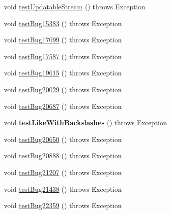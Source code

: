 \begin{DoxyCompactItemize}
void \mbox{\hyperlink{classtestsuite_1_1regression_1_1_statement_regression_test_a7695fd8186a02b78d65dc3af0db02e34}{test\+Updatable\+Stream}} ()  throws Exception 
\item 
void \mbox{\hyperlink{classtestsuite_1_1regression_1_1_statement_regression_test_a8077d99b51217d8479e3637eac582d17}{test\+Bug15383}} ()  throws Exception 
\item 
void \mbox{\hyperlink{classtestsuite_1_1regression_1_1_statement_regression_test_af66916471e845ecaf25d5a2e0e3b67eb}{test\+Bug17099}} ()  throws Exception 
\item 
void \mbox{\hyperlink{classtestsuite_1_1regression_1_1_statement_regression_test_a31f8a70535a902a36164d60c222d0430}{test\+Bug17587}} ()  throws Exception 
\item 
void \mbox{\hyperlink{classtestsuite_1_1regression_1_1_statement_regression_test_a8b65f0d094f2bb8f3e1fc9d4181c956c}{test\+Bug19615}} ()  throws Exception 
\item 
void \mbox{\hyperlink{classtestsuite_1_1regression_1_1_statement_regression_test_abe26694e3066526cd5be755352de286b}{test\+Bug20029}} ()  throws Exception 
\item 
void \mbox{\hyperlink{classtestsuite_1_1regression_1_1_statement_regression_test_a0267fce90c408fe4f218251a41707fdc}{test\+Bug20687}} ()  throws Exception 
\item 
\mbox{\label{classtestsuite_1_1regression_1_1_statement_regression_test_a0d2d4005580ed91cedff282491537e23}} 
void {\bfseries test\+Like\+With\+Backslashes} ()  throws Exception 
\item 
void \mbox{\hyperlink{classtestsuite_1_1regression_1_1_statement_regression_test_ac72c67849f782594f7036b96b6053eed}{test\+Bug20650}} ()  throws Exception 
\item 
void \mbox{\hyperlink{classtestsuite_1_1regression_1_1_statement_regression_test_a1c0e3e171ebbd64605711647d9b930c0}{test\+Bug20888}} ()  throws Exception 
\item 
void \mbox{\hyperlink{classtestsuite_1_1regression_1_1_statement_regression_test_a16c4c52784a96bfcf47397ce9a1d0efb}{test\+Bug21207}} ()  throws Exception 
\item 
void \mbox{\hyperlink{classtestsuite_1_1regression_1_1_statement_regression_test_a47c163cd72fcd1b2cf392941cd2b074c}{test\+Bug21438}} ()  throws Exception 
\item 
void \mbox{\hyperlink{classtestsuite_1_1regression_1_1_statement_regression_test_a0e9ad9980acf6229f9b41dff9972e1c5}{test\+Bug22359}} ()  throws Exception 

\end{DoxyCompactItemize}
